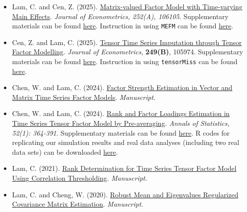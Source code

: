 \documentclass[overlapped,line,letterpaper]{res}
\begin{document}
\begin{resume}
\begin{itemize}
\item[$\bullet$]  Lam, C. and Cen, Z. (2025). \href{https://cliffordlam.github.io/files/ECONOM_106105.pdf}{Matrix-valued Factor Model with Time-varying Main Effects}. {\em Journal of Econometrics, 252(A), 106105}. Supplementary materials can be found \href{https://cliffordlam.github.io/files/Supp-MEFM.pdf}{here}. Instruction in using \texttt{MEFM} can be found \href{https://cliffordlam.github.io/files/A-short-introduction-to-MEFM.html}{here}.


\item[$\bullet$] Cen, Z. and Lam, C. (2025). \href{https://cliffordlam.github.io/files/tensorMiss-final.pdf}{Tensor Time Series Imputation through Tensor Factor Modelling}. {\em Journal of Econometrics}, {\bf 249(B)}, 105974. Supplementary materials can be found \href{https://cliffordlam.github.io/files/Supp-tensorMiss.pdf}{here}. Instruction in using \texttt{tensorMiss} can be found \href{https://cliffordlam.github.io/files/intro-to-tensorMiss.html}{here}.








\item[$\bullet$] Chen, W. and Lam, C. (2024).
\href{https://cliffordlam.github.io/files/factor_strength.pdf}{Factor Strength Estimation in Vector and Matrix Time Series Factor Models}. {\em Manuscript}.





\item[$\bullet$] Chen, W. and Lam, C. (2024). \href{https://cliffordlam.github.io/files/TensorPreAvg_final-AOS.pdf}{Rank and Factor Loadings Estimation in Time Series
Tensor Factor Model by Pre-averaging}. {\em Annals of Statistics,  52(1): 364-391}. Supplementary materials can be found \href{https://cliffordlam.github.io/files/supplement.pdf}{here}. R codes for replicating our simulation results and real data analyses (including two real data sets) can be downloaded \href{https://cliffordlam.github.io/files/Rcodes\_revised\_paper.zip}{here}.

\item[$\bullet$] Lam, C. (2021). \href{https://cliffordlam.github.io/files/TensorRank.pdf}{Rank Determination for Time Series Tensor Factor Model Using Correlation Thresholding}. {\em Manuscript}.


\item[$\bullet$] Lam, C. and Cheng, W. (2020). \href{https://cliffordlam.github.io/files/RNERCOME.pdf}{Robust Mean and Eigenvalues Regularized Covariance Matrix Estimation}. {\em Manuscript}.



\end{itemize}
\end{resume}
\end{document}
